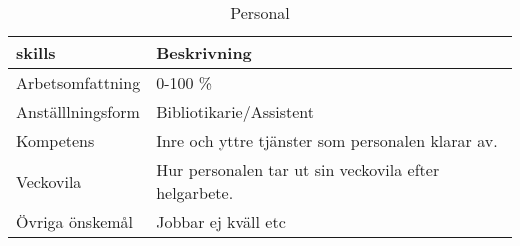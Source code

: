 


\begin{table}[h]
\centering
\caption{Personal}
\label{int:1}
\begin{tabular}{|l|l|}
\hline 
\textbf{skills} & \textbf{Beskrivning} \\ \hline
Arbetsomfattning & 0-100 \% 
\\ \hline 
Anställlningsform & Bibliotikarie/Assistent
\\ \hline 
Kompetens & Inre och yttre tjänster som personalen klarar av.  
\\ \hline 
Veckovila & Hur personalen tar ut sin veckovila efter helgarbete.
\\ \hline 
Övriga önskemål & Jobbar ej kväll etc
\\ \hline 
\end{tabular}
\end{table}


